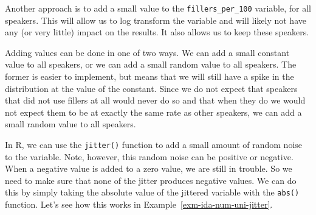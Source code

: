 \documentclass[
  letterpaper,
  DIV=11,
  numbers=noendperiod]{scrreprt}
\theoremstyle{definition}
\theoremstyle{remark}
\begin{document}
Another approach is to add a small value to the
\texttt{fillers\_per\_100} variable, for all speakers. This will allow
us to log transform the variable and will likely not have any (or very
little) impact on the results. It also allows us to keep these speakers.

Adding values can be done in one of two ways. We can add a small
constant value to all speakers, or we can add a small random value to
all speakers. The former is easier to implement, but means that we will
still have a spike in the distribution at the value of the constant.
Since we do not expect that speakers that did not use fillers at all
would never do so and that when they do we would not expect them to be
at exactly the same rate as other speakers, we can add a small random
value to all speakers.

In R, we can use the \texttt{jitter()} function to add a small amount of
random noise to the variable. Note, however, this random noise can be
positive or negative. When a negative value is added to a zero value, we
are still in trouble. So we need to make sure that none of the jitter
produces negative values. We can do this by simply taking the absolute
value of the jittered variable with the \texttt{abs()} function. Let's
see how this works in Example~\ref{exm-ida-num-uni-jitter}.
\end{document}

